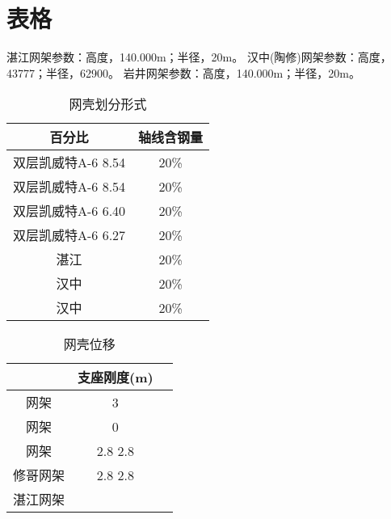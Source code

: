 \documentclass[b5paper,UTF8]{book}
\begin{document}









\chapter{表格}


湛江网架参数：高度，140.000m；半径，20m。    
汉中(陶修)网架参数：高度，43777；半径，62900。
岩井网架参数：高度，140.000m；半径，20m。


\begin{table}[htbp]
\centering
\caption{网壳划分形式}
\label{tab:TrussDivided}
\begin{tabular}{cc}
\toprule
    百分比            & 轴线含钢量     \\
\midrule
双层凯威特A-6  8.54   &      20\%      \\
双层凯威特A-6  8.54   &      20\%      \\
双层凯威特A-6  6.40   &      20\%      \\
双层凯威特A-6  6.27   &      20\%      \\
\hline
湛江                  &      20\%      \\
汉中                  &      20\%      \\
汉中                  &      20\%      \\
\bottomrule                             
\end{tabular}
\end{table}


\begin{landscape}
\begin{table}
\centering
\caption{网壳位移}
\label{tab:TrussDisplacement}
\begin{tabular}{ccc}
\toprule
                & 支座刚度(m) & \\
\midrule 
网架     & 3            &       \\
网架     & 0            &       \\
网架     & 2.8 2.8   &          \\
修哥网架 & 2.8 2.8   &          \\
湛江网架 &               &      \\
\bottomrule                             
\end{tabular}
\end{table}
\end{landscape}     
\end{document}
